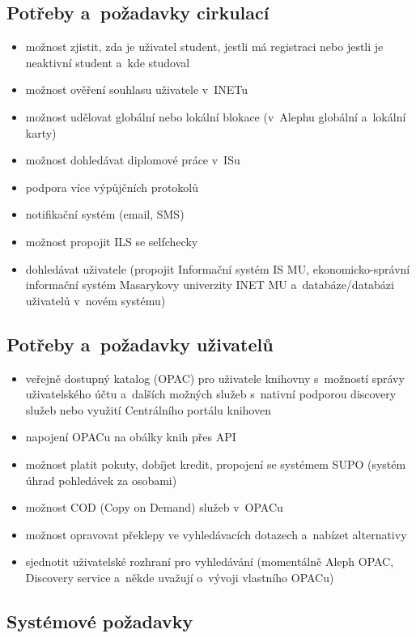 \documentclass[
	11pt, oneside, printed, final, palatino, monochrome
	microtype,
	table,   %
	lof,     %
	lot     %
]{fithesis3}
\begin{document}
{\subsection{Potřeby a~požadavky cirkulací}

\begin{itemize}
\item možnost zjistit, zda je uživatel student, jestli má registraci nebo jestli je neaktivní student a~kde studoval
\item možnost ověření souhlasu uživatele v~INETu
\item možnost udělovat globální nebo lokální blokace (v~Alephu globální a~lokální karty)
\item možnost dohledávat diplomové práce v~ISu
\item podpora více výpůjčních protokolů
\item notifikační systém (email, SMS)
\item možnost propojit ILS se selfchecky
\item dohledávat uživatele (propojit Informační systém IS MU, ekonomicko-správní informační systém Masarykovy univerzity INET MU a~databáze/databázi uživatelů v~novém systému)
\end{itemize}

\subsection{Potřeby a~požadavky uživatelů}

\begin{itemize}
\item veřejně dostupný katalog (OPAC) pro uživatele knihovny s~možností správy uživatelského účtu a~dalších možných služeb s~nativní podporou discovery služeb nebo využití Centrálního portálu knihoven
\item napojení OPACu na obálky knih přes API 
\item možnost platit pokuty, dobíjet kredit, propojení se systémem SUPO (systém úhrad pohledávek za osobami)
\item možnost COD (Copy on Demand) služeb v~OPACu
\item možnost opravovat překlepy ve vyhledávacích dotazech a~nabízet alternativy
\item sjednotit uživatelské rozhraní pro vyhledávání (momentálně Aleph OPAC, Discovery service a~někde uvažují o~vývoji vlastního OPACu)
\end{itemize}

\subsection{Systémové požadavky}

}
\end{document}
